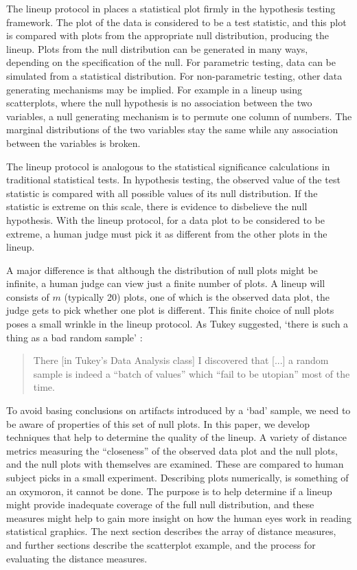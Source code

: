 \documentclass[12]{report}
\begin{document}
The lineup protocol in \citep{buja:2009} 
places a statistical plot firmly in the hypothesis testing framework. The plot of the data is considered to be a test statistic, and this plot is compared with plots from the appropriate null distribution, producing the lineup. Plots from the null distribution can be generated in many ways, depending on the specification of the null. For parametric testing, data can be simulated from a statistical distribution. For non-parametric testing, other data generating mechanisms may be implied. For example in a lineup using scatterplots, where the null hypothesis is no association between the two variables,  a null generating mechanism is to permute one column of numbers. The marginal distributions of the two variables stay the same while any association between the variables is broken. 

The lineup protocol is analogous to the statistical significance calculations in traditional statistical tests. In hypothesis testing, the observed value of the test statistic is compared with all possible values of its null distribution. If the statistic is extreme on this scale, there is evidence to disbelieve the null hypothesis. With the lineup protocol, for a data plot to be considered to be extreme, a human judge must pick it as different from the other plots in the lineup. 

A major difference is that although the distribution of null plots might be infinite, a human judge can view just a finite number of plots. A lineup will consists of $m$ (typically 20) plots, one of which is the observed data plot, the judge gets to pick whether one plot is different. This finite choice of null plots poses a small wrinkle in the lineup protocol. As Tukey suggested, `there is such a thing as a bad random sample' \citep{fernholz03}:

\begin{quotation}
There [in Tukey's Data Analysis class] I discovered that [...]  a random sample is indeed a ``batch of values'' which ``fail to be utopian'' most of the time.
\end{quotation}

To avoid basing conclusions on artifacts introduced by a `bad' sample, we need to be aware of properties of this set of null plots. In this paper, we develop techniques that help to determine the quality of the lineup. A variety of distance metrics measuring the ``closeness'' of the observed data plot and the null plots, and the null plots with themselves are examined. These are compared to human subject picks in a small experiment.  Describing plots numerically, is something  of an oxymoron, it cannot be done. The purpose is to help determine if a lineup might provide inadequate coverage of the full null distribution, and these measures might help to gain more insight on how the human eyes work in reading statistical graphics. The next section describes the array of distance measures, and further sections describe the scatterplot example, and the process for evaluating the distance measures. 
\end{document}
